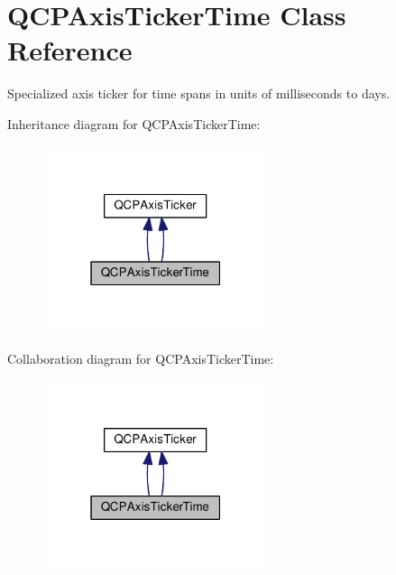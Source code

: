 \hypertarget{class_q_c_p_axis_ticker_time}{}\section{Q\+C\+P\+Axis\+Ticker\+Time Class Reference}
\label{class_q_c_p_axis_ticker_time}


Specialized axis ticker for time spans in units of milliseconds to days.  




Inheritance diagram for Q\+C\+P\+Axis\+Ticker\+Time\+:\nopagebreak
\begin{figure}[H]
\begin{center}
\leavevmode
\includegraphics[width=187pt]{class_q_c_p_axis_ticker_time__inherit__graph}
\end{center}
\end{figure}


Collaboration diagram for Q\+C\+P\+Axis\+Ticker\+Time\+:\nopagebreak
\begin{figure}[H]
\begin{center}
\leavevmode
\includegraphics[width=187pt]{class_q_c_p_axis_ticker_time__coll__graph}
\end{center}
\end{figure}
